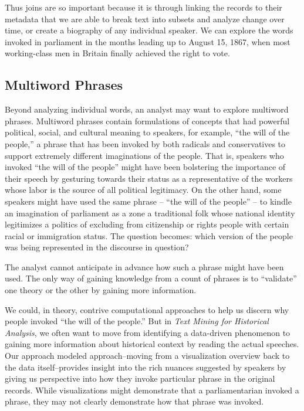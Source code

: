 \documentclass[
]{article}
\begin{document}
Thus joins are so important because it is through linking the records to
their metadata that we are able to break text into subsets and analyze
change over time, or create a biography of any individual speaker. We
can explore the words invoked in parliament in the months leading up to
August 15, 1867, when most working-class men in Britain finally achieved
the right to vote.

\subsection{Multiword Phrases}\label{multiword-phrases}

Beyond analyzing individual words, an analyst may want to explore
multiword phrases. Multiword phrases contain formulations of concepts
that had powerful political, social, and cultural meaning to speakers,
for example, ``the will of the people,'' a phrase that has been invoked
by both radicals and conservatives to support extremely different
imaginations of the people. That is, speakers who invoked ``the will of
the people'' might have been bolstering the importance of their speech
by gesturing towards their status as a representative of the workers
whose labor is the source of all political legitimacy. On the other
hand, some speakers might have used the same phrase -- ``the will of the
people'' -- to kindle an imagination of parliament as a zone a
traditional folk whose national identity legitimizes a politics of
excluding from citizenship or rights people with certain racial or
immigration status. The question becomes: which version of the people
was being represented in the discourse in question?

The analyst cannot anticipate in advance how such a phrase might have
been used. The only way of gaining knowledge from a count of phrases is
to ``validate'' one theory or the other by gaining more information.

We could, in theory, contrive computational approaches to help us
discern why people invoked ``the will of the people.'' But in \emph{Text
Mining for Historical Analysis}, we often want to move from identifying
a data-driven phenomenon to gaining more information about historical
context by reading the actual speeches. Our approach modeled
approach--moving from a visualization overview back to the data
itself--provides insight into the rich nuances suggested by speakers by
giving us perspective into how they invoke particular phrase in the
original records. While visualizations might demonstrate that a
parliamentarian invoked a phrase, they may not clearly demonstrate how
that phrase was invoked.
\end{document}
